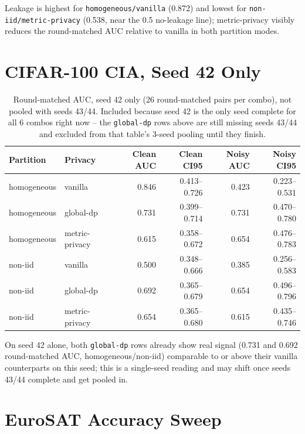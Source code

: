 \documentclass[11pt]{article}
\newcommand{\code}[1]{\texttt{#1}}
\begin{document}
\noindent
Leakage is highest for \code{homogeneous/vanilla} (0.872) and lowest for
\code{non-iid/metric-privacy} (0.538, near the 0.5 no-leakage line); metric-privacy visibly
reduces the round-matched AUC relative to vanilla in both partition modes.

\section*{CIFAR-100 CIA, Seed 42 Only}

\begin{table}[h!]
\centering
\begin{tabular}{llrrrr}
\toprule
Partition & Privacy & Clean AUC & Clean CI95 & Noisy AUC & Noisy CI95 \\
\midrule
homogeneous & vanilla & 0.846 & 0.413--0.726 & 0.423 & 0.223--0.531 \\
homogeneous & global-dp & 0.731 & 0.399--0.714 & 0.731 & 0.470--0.780 \\
homogeneous & metric-privacy & 0.615 & 0.358--0.672 & 0.654 & 0.476--0.783 \\
non-iid & vanilla & 0.500 & 0.348--0.666 & 0.385 & 0.256--0.583 \\
non-iid & global-dp & 0.692 & 0.365--0.679 & 0.654 & 0.496--0.796 \\
non-iid & metric-privacy & 0.654 & 0.365--0.680 & 0.615 & 0.435--0.746 \\
\bottomrule
\end{tabular}
\caption*{Round-matched AUC, seed 42 only (26 round-matched pairs per combo), not pooled with
seeds 43/44. Included because seed 42 is the only seed complete for all 6 combos right now --
the \code{global-dp} rows above are still missing seeds 43/44 and excluded from that table's
3-seed pooling until they finish.}
\end{table}

\noindent
On seed 42 alone, both \code{global-dp} rows already show real signal (0.731 and 0.692
round-matched AUC, homogeneous/non-iid) comparable to or above their vanilla counterparts on this
seed; this is a single-seed reading and may shift once seeds 43/44 complete and get pooled in.

\section*{EuroSAT Accuracy Sweep}
\end{document}
